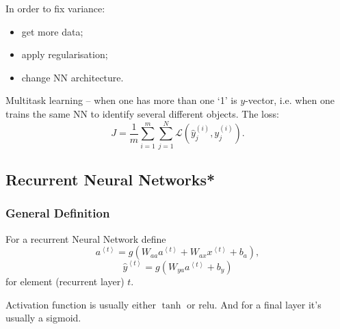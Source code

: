 \documentclass[a4paper,11pt]{article}
\begin{document}
In order to fix variance:
\begin{itemize}
\item get more data;
\item apply regularisation;
\item change NN architecture.
\end{itemize}

Multitask learning -- when one has more than one `1' is \textcolor{OliveGreen}{$y$}-vector, i.e. when one trains the same NN to identify several different objects. The loss:
\begin{equation}
J = \frac{1}{m} \sum_{i=1} ^m \sum_{j=1} ^N \mathcal{L} \left(\hat{y}_j ^{(i)} , y_j ^{(i)} \right) .
\end{equation}
\subsection{Recurrent Neural Networks*}
\subsubsection{General Definition}
For a recurrent Neural Network define
\begin{equation}
a^{\left\langle t \right\rangle} = g \left(W_{aa} a^{\left\langle t \right\rangle} + W_{ax} x^{\left\langle t \right\rangle} + b_a \right) ,
\end{equation}
\begin{equation}
\hat{y}^{\left\langle t \right\rangle} = g \left(W_{ya} a^{\left\langle t \right\rangle} + b_y \right)
\end{equation}
for element (recurrent layer) \textcolor{OliveGreen}{$t$}.

Activation function is usually either \textcolor{OliveGreen}{$\tanh$} or \textcolor{OliveGreen}{$\text{relu}$}. And for a final layer it's usually a sigmoid.

\noindent{}
\end{document}
